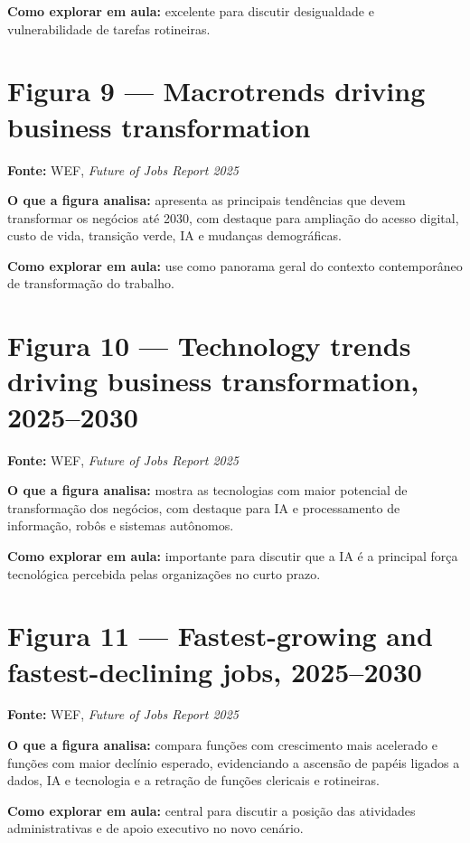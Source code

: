 \documentclass[
]{book}
\theoremstyle{definition}
\theoremstyle{definition}
\theoremstyle{definition}
\theoremstyle{definition}
\theoremstyle{remark}
\begin{document}
\textbf{Como explorar em aula:} excelente para discutir desigualdade e vulnerabilidade de tarefas rotineiras.

\section{Figura 9 --- Macrotrends driving business transformation}\label{figura-9-macrotrends-driving-business-transformation}

\textbf{Fonte:} WEF, \emph{Future of Jobs Report 2025}

\textbf{O que a figura analisa:} apresenta as principais tendências que devem transformar os negócios até 2030, com destaque para ampliação do acesso digital, custo de vida, transição verde, IA e mudanças demográficas.

\textbf{Como explorar em aula:} use como panorama geral do contexto contemporâneo de transformação do trabalho.

\section{Figura 10 --- Technology trends driving business transformation, 2025--2030}\label{figura-10-technology-trends-driving-business-transformation-20252030}

\textbf{Fonte:} WEF, \emph{Future of Jobs Report 2025}

\textbf{O que a figura analisa:} mostra as tecnologias com maior potencial de transformação dos negócios, com destaque para IA e processamento de informação, robôs e sistemas autônomos.

\textbf{Como explorar em aula:} importante para discutir que a IA é a principal força tecnológica percebida pelas organizações no curto prazo.

\section{Figura 11 --- Fastest-growing and fastest-declining jobs, 2025--2030}\label{figura-11-fastest-growing-and-fastest-declining-jobs-20252030}

\textbf{Fonte:} WEF, \emph{Future of Jobs Report 2025}

\textbf{O que a figura analisa:} compara funções com crescimento mais acelerado e funções com maior declínio esperado, evidenciando a ascensão de papéis ligados a dados, IA e tecnologia e a retração de funções clericais e rotineiras.

\textbf{Como explorar em aula:} central para discutir a posição das atividades administrativas e de apoio executivo no novo cenário.
\end{document}
